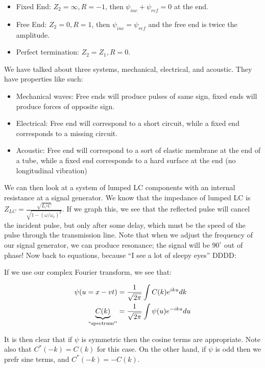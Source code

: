 \documentclass{report}
\begin{document}
\begin{itemize}
\item Fixed End: $Z_2 = \infty, R = -1$, then $\psi_{inc} + \psi_{ref} = 0$ at the end.
\item Free End: $Z_2 = 0, R = 1$, then $\psi_{inc} = \psi_{ref}$ and the free end is twice the amplitude.
\item Perfect termination: $Z_2 = Z_1, R=0$. 
\end{itemize}

We have talked about three systems, mechanical, electrical, and acoustic. They have properties like such:

\begin{itemize}
\item Mechanical waves: Free ends will produce pulses of same sign, fixed ends will produce forces of opposite sign.
\item Electrical: Free end will correspond to a short circuit, while a fixed end corresponds to a missing circuit.
\item Acoustic: Free end will correspond to a sort of elastic membrane at the end of a tube, while a fixed end corresponds to a hard surface at the end (no longitudinal vibration)
\end{itemize}

We can then look at a system of lumped LC components with an internal resistance at a signal generator. We know that the impedance of lumped LC is $Z_{LC} = \frac{\sqrt{L/C}}{\sqrt{1-(\omega/\omega_c)^2}}$. If we graph this, we see that the reflected pulse will cancel the incident pulse, but only after some delay, which must be the speed of the pulse through the transmission line. Note that when we adjust the frequency of our signal generator, we can produce resonance; the signal will be $90^\circ$ out of phase! Now back to equations, because ``I see a lot of sleepy eyes'' DDDD:

If we use our complex Fourier transform, we see that:

\begin{align*}
\psi(u=x-vt) &= \frac{1}{\sqrt{2\pi}}\int C(k) e^{iku} dk\\
\underbrace{C(k)}_{\mathrm{``spectrum''}} &= \frac{1}{\sqrt{2\pi}}\int \psi(u) e^{-iku} du
\end{align*}

It is then clear that if $\psi$ is symmetric then the cosine terms are appropriate. Note also that $C^*(-k) = C(k)$ for this case. On the other hand, if $\psi$ is odd then we prefr sine terms, and $C^*(-k) = -C(k)$.
\end{document}
